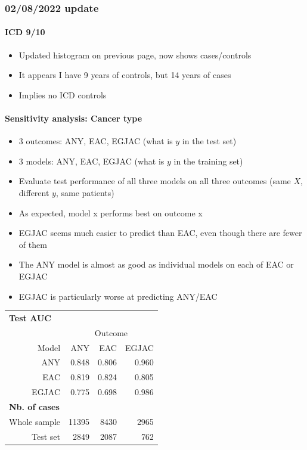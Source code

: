 \documentclass[12pt]{article}
\begin{document}
\pagebreak
\subsubsection*{02/08/2022 update}


\paragraph*{ICD 9/10}
\begin{itemize}
	\item Updated histogram on previous page, now shows cases/controls
	\item It appears I have 9 years of controls, but 14 years of cases
	\item Implies no ICD controls
\end{itemize}



\paragraph*{Sensitivity analysis: Cancer type}
\begin{itemize}
	\item 3 outcomes: ANY, EAC, EGJAC (what is $y$ in the test set)
	\item 3 models: ANY, EAC, EGJAC (what is $y$ in the training set)
	\item Evaluate test performance of all three models on all three
	 outcomes (same $X$, different $y$, same patients)
	\item As expected, model x performs best on outcome x
	\item EGJAC seems much easier to predict than EAC, even though 
	there are fewer of them
	\item The ANY model is almost as good as individual models on each of
	EAC or EGJAC
	\item EGJAC is particularly worse at predicting ANY/EAC
\end{itemize}


\begin{table}[ht]
\centering
\begin{tabular}{rrrr}
  \toprule
  \multicolumn{4}{l}{\textbf{Test AUC}}\\
  & \multicolumn{3}{c}{Outcome}\\ \cmidrule(l){2-4}
Model & ANY & EAC & EGJAC \\ 
  \midrule
ANY & 0.848 & 0.806 & 0.960 \\ 
  EAC & 0.819 & 0.824 & 0.805 \\ 
  EGJAC & 0.775 & 0.698 & 0.986 \\ 
  \midrule
  \multicolumn{4}{l}{\textbf{Nb. of cases}}\\\addlinespace
  Whole sample & 11395 & 8430 & 2965 \\
  Test set & 2849 & 2087 & 762 \\
   \bottomrule
\end{tabular}
\end{table}
\end{document}
